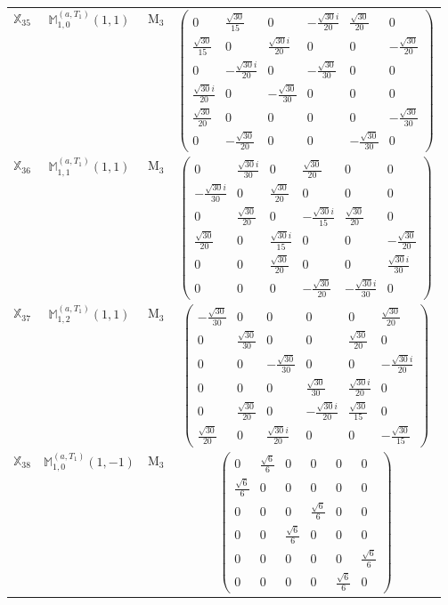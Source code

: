 \documentclass[fleqn,10pt,landscape]{article}
\begin{document}
\begin{itemize}
\begin{center}
\begin{longtable}{c|c|c|c}
$ \mathbb{X}_{35} $ & $\mathbb{M}_{1,0}^{(a,T_{1})}(1,1)$ & M$_{3}$ & $\begin{pmatrix} 0 & \frac{\sqrt{30}}{15} & 0 & - \frac{\sqrt{30} i}{20} & \frac{\sqrt{30}}{20} & 0 \\ \frac{\sqrt{30}}{15} & 0 & \frac{\sqrt{30} i}{20} & 0 & 0 & - \frac{\sqrt{30}}{20} \\ 0 & - \frac{\sqrt{30} i}{20} & 0 & - \frac{\sqrt{30}}{30} & 0 & 0 \\ \frac{\sqrt{30} i}{20} & 0 & - \frac{\sqrt{30}}{30} & 0 & 0 & 0 \\ \frac{\sqrt{30}}{20} & 0 & 0 & 0 & 0 & - \frac{\sqrt{30}}{30} \\ 0 & - \frac{\sqrt{30}}{20} & 0 & 0 & - \frac{\sqrt{30}}{30} & 0 \end{pmatrix}$ \\
$ \mathbb{X}_{36} $ & $\mathbb{M}_{1,1}^{(a,T_{1})}(1,1)$ & M$_{3}$ & $\begin{pmatrix} 0 & \frac{\sqrt{30} i}{30} & 0 & \frac{\sqrt{30}}{20} & 0 & 0 \\ - \frac{\sqrt{30} i}{30} & 0 & \frac{\sqrt{30}}{20} & 0 & 0 & 0 \\ 0 & \frac{\sqrt{30}}{20} & 0 & - \frac{\sqrt{30} i}{15} & \frac{\sqrt{30}}{20} & 0 \\ \frac{\sqrt{30}}{20} & 0 & \frac{\sqrt{30} i}{15} & 0 & 0 & - \frac{\sqrt{30}}{20} \\ 0 & 0 & \frac{\sqrt{30}}{20} & 0 & 0 & \frac{\sqrt{30} i}{30} \\ 0 & 0 & 0 & - \frac{\sqrt{30}}{20} & - \frac{\sqrt{30} i}{30} & 0 \end{pmatrix}$ \\
$ \mathbb{X}_{37} $ & $\mathbb{M}_{1,2}^{(a,T_{1})}(1,1)$ & M$_{3}$ & $\begin{pmatrix} - \frac{\sqrt{30}}{30} & 0 & 0 & 0 & 0 & \frac{\sqrt{30}}{20} \\ 0 & \frac{\sqrt{30}}{30} & 0 & 0 & \frac{\sqrt{30}}{20} & 0 \\ 0 & 0 & - \frac{\sqrt{30}}{30} & 0 & 0 & - \frac{\sqrt{30} i}{20} \\ 0 & 0 & 0 & \frac{\sqrt{30}}{30} & \frac{\sqrt{30} i}{20} & 0 \\ 0 & \frac{\sqrt{30}}{20} & 0 & - \frac{\sqrt{30} i}{20} & \frac{\sqrt{30}}{15} & 0 \\ \frac{\sqrt{30}}{20} & 0 & \frac{\sqrt{30} i}{20} & 0 & 0 & - \frac{\sqrt{30}}{15} \end{pmatrix}$ \\
$ \mathbb{X}_{38} $ & $\mathbb{M}_{1,0}^{(a,T_{1})}(1,-1)$ & M$_{3}$ & $\begin{pmatrix} 0 & \frac{\sqrt{6}}{6} & 0 & 0 & 0 & 0 \\ \frac{\sqrt{6}}{6} & 0 & 0 & 0 & 0 & 0 \\ 0 & 0 & 0 & \frac{\sqrt{6}}{6} & 0 & 0 \\ 0 & 0 & \frac{\sqrt{6}}{6} & 0 & 0 & 0 \\ 0 & 0 & 0 & 0 & 0 & \frac{\sqrt{6}}{6} \\ 0 & 0 & 0 & 0 & \frac{\sqrt{6}}{6} & 0 \end{pmatrix}$ \\

\end{longtable}
\end{center}
\end{itemize}
\end{document}
